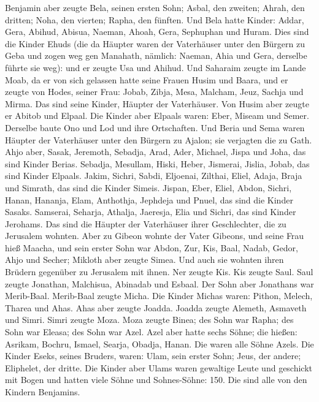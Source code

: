  Benjamin aber zeugte Bela, seinen ersten Sohn; Asbal, den
zweiten; Ahrah, den dritten;  Noha, den vierten; Rapha,
den fünften.  Und Bela hatte Kinder: Addar, Gera, Abihud,
 Abisua, Naeman, Ahoah,  Gera, Sephuphan und
Huram.  Dies sind die Kinder Ehuds (die da Häupter waren
der Vaterhäuser unter den Bürgern zu Geba und zogen weg gen Manahath,
 nämlich: Naeman, Ahia und Gera, derselbe führte sie weg):
und er zeugte Usa und Ahihud.  Und Saharaim zeugte im
Lande Moab, da er von sich gelassen hatte seine Frauen Husim und Baara,
 und er zeugte von Hodes, seiner Frau: Jobab, Zibja, Mesa,
Malcham,  Jeuz, Sachja und Mirma. Das sind seine Kinder,
Häupter der Vaterhäuser.  Von Husim aber zeugte er Abitob
und Elpaal.  Die Kinder aber Elpaals waren: Eber, Miseam
und Semer. Derselbe baute Ono und Lod und ihre Ortschaften.
 Und Beria und Sema waren Häupter der Vaterhäuser unter
den Bürgern zu Ajalon; sie verjagten die zu Gath.  Ahjo
aber, Sasak, Jeremoth,  Sebadja, Arad, Ader,
 Michael, Jispa und Joha, das sind Kinder Berias.
 Sebadja, Mesullam, Hiski, Heber, 
Jismerai, Jislia, Jobab, das sind Kinder Elpaals.  Jakim,
Sichri, Sabdi,  Eljoenai, Zilthai, Eliel, 
Adaja, Braja und Simrath, das sind die Kinder Simeis. 
Jispan, Eber, Eliel,  Abdon, Sichri, Hanan,
 Hananja, Elam, Anthothja,  Jephdeja und
Pnuel, das sind die Kinder Sasaks.  Samserai, Seharja,
Athalja,  Jaeresja, Elia und Sichri, das sind Kinder
Jerohams.  Das sind die Häupter der Vaterhäuser ihrer
Geschlechter, die zu Jerusalem wohnten.  Aber zu Gibeon
wohnte der Vater Gibeons, und seine Frau hieß Maacha, 
und sein erster Sohn war Abdon, Zur, Kis, Baal, Nadab, 
Gedor, Ahjo und Secher;  Mikloth aber zeugte Simea. Und
auch sie wohnten ihren Brüdern gegenüber zu Jerusalem mit ihnen.
 Ner zeugte Kis. Kis zeugte Saul. Saul zeugte Jonathan,
Malchisua, Abinadab und Esbaal.  Der Sohn aber Jonathans
war Merib-Baal. Merib-Baal zeugte Micha.  Die Kinder
Michas waren: Pithon, Melech, Tharea und Ahas.  Ahas aber
zeugte Joadda. Joadda zeugte Alemeth, Asmaveth und Simri. Simri zeugte
Moza.  Moza zeugte Binea; des Sohn war Rapha; des Sohn
war Eleasa; des Sohn war Azel.  Azel aber hatte sechs
Söhne; die hießen: Asrikam, Bochru, Ismael, Searja, Obadja, Hanan. Die
waren alle Söhne Azels.  Die Kinder Eseks, seines
Bruders, waren: Ulam, sein erster Sohn; Jeus, der andere; Eliphelet, der
dritte.  Die Kinder aber Ulams waren gewaltige Leute und
geschickt mit Bogen und hatten viele Söhne und Sohnes-Söhne: 150. Die
sind alle von den Kindern Benjamins.

